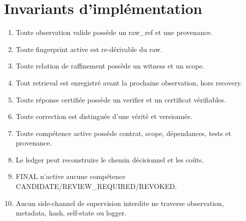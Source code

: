 \documentclass[11pt,a4paper]{report}
\begin{document}
\chapter{Invariants d'implémentation}
\begin{enumerate}
\item Toute observation valide possède un raw\_ref et une provenance.
\item Toute fingerprint active est re-dérivable du raw.
\item Toute relation de raffinement possède un witness et un scope.
\item Tout retrieval est enregistré avant la prochaine observation, hors recovery.
\item Toute réponse certifiée possède un verifier et un certificat vérifiables.
\item Toute correction est distinguée d'une vérité et versionnée.
\item Toute compétence active possède contrat, scope, dépendances, tests et provenance.
\item Le ledger peut reconstruire le chemin décisionnel et les coûts.
\item FINAL n'active aucune compétence CANDIDATE/REVIEW\_REQUIRED/REVOKED.
\item Aucun side-channel de supervision interdite ne traverse observation, metadata, hash, self-state ou logger.
\end{enumerate}
\end{document}
